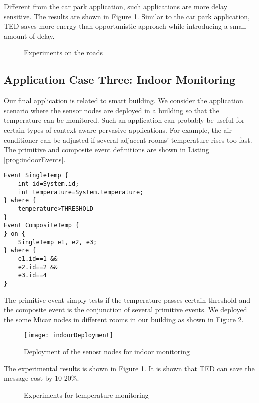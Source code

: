 Different from the car park application, such applications are more delay sensitive. The results are shown in Figure \ref{fig:itsResults}. Similar to the car park application, TED saves more energy than opportunistic approach while introducing a small amount of delay.
 
\begin{figure}
\centering
{}
\caption{Experiments on the roads}
\label{fig:itsResults}
\end{figure}

\subsection{Application Case Three: Indoor Monitoring}
Our final application is related to smart building. We consider the application scenario where the sensor nodes are deployed in a building so that the temperature can be monitored. Such an application can probably be useful for certain types of context aware pervasive applications. For example, the air conditioner can be adjusted if several adjacent rooms' temperature rises too fast. The primitive and composite event definitions are shown in Listing \ref{prog:indoorEvents}.

\begin{lstlisting}[caption=Event definition for indoor monitoring, label=prog:indoorEvents]
Event SingleTemp {
	int id=System.id;
	int temperature=System.temperature;
} where {
	temperature>THRESHOLD
}
Event CompositeTemp {
} on {
	SingleTemp e1, e2, e3;
} where {
	e1.id==1 &&
	e2.id==2 &&
	e3.id==4
}
\end{lstlisting}

The primitive event simply tests if the temperature passes certain threshold and the composite event is the conjunction of several primitive events. We deployed the some Micaz nodes in different rooms in our building as shown in Figure \ref{fig:indoorDeployment}.

\begin{figure}
\centering
\texttt{[image: indoorDeployment]}
\caption{Deployment of the senosr nodes for indoor monitoring}
\label{fig:indoorDeployment}
\end{figure}

The experimental results is shown in Figure \ref{fig:itsResults}. It is shown that TED can save the message cost by 10-20\%.

\begin{figure}
\centering
{}
\caption{Experiments for temperature monitoring}
\label{fig:indoorResult}
\end{figure}